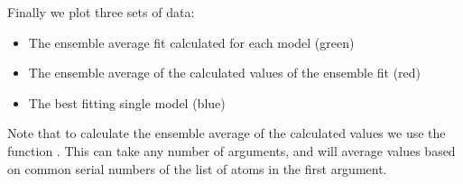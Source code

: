\documentclass[a4paper,10pt,english,openany,oneside]{sphinxmanual}
\begin{document}
%
\begin{sphinxVerbatim}[commandchars=\\\{\}]
  
   
	   
	    
		 \PYG{p}{[}\PYG{p}{]}
	 \PYG{p}{[}\PYG{p}{]}  
		  
		  
		  
		  
		  
\end{sphinxVerbatim}

Finally we plot three sets of data:
\begin{itemize}
\item {} 
The ensemble average fit calculated for each model (green)

\item {} 
The ensemble average of the calculated values of the ensemble fit (red)

\item {} 
The best fitting single model (blue)

\end{itemize}

Note that to calculate the ensemble average of the calculated values we use the function {\hyperref[\detokenize{reference/generated/paramagpy.fit.ensemble_average:paramagpy.fit.ensemble_average}]{}}. This can take any number of arguments, and will average values based on common serial numbers of the list of atoms in the first argument.
\end{document}
